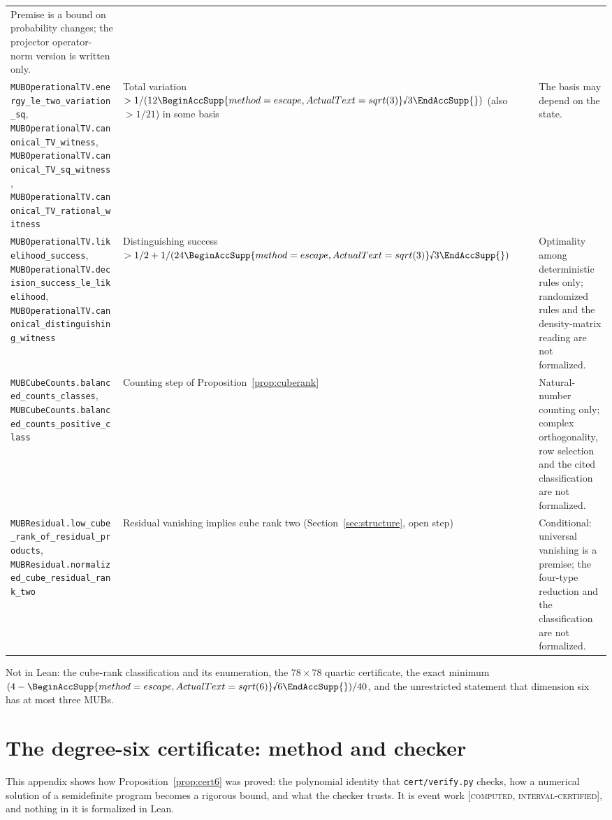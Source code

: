 \documentclass[11pt]{article}
\newcommand{\rnum}[1]{\BeginAccSupp{method=escape,ActualText=sqrt(#1)}\text{\textsurd}#1\EndAccSupp{}}
\newcommand{\st}[1]{\textsc{[#1]}}
\newcommand{\stcert}{\st{computed, interval-certified}}
\theoremstyle{definition}
\theoremstyle{remark}
\begin{document}
{\begin{longtable}{@{}>{\raggedright\arraybackslash}p{5.6cm}>{\raggedright\arraybackslash}p{4.2cm}>{\raggedright\arraybackslash}p{5.6cm}@{}}
Premise is a bound on probability changes; the projector operator-norm version is written only.\\
\texttt{MUBOperationalTV.}\allowbreak\texttt{energy\_le\_two\_variation\_sq}, \texttt{MUBOperationalTV.}\allowbreak\texttt{canonical\_TV\_witness},
\texttt{MUBOperationalTV.}\allowbreak\texttt{canonical\_TV\_sq\_witness}, \texttt{MUBOperationalTV.}\allowbreak\texttt{canonical\_TV\_rational\_witness} &
Total variation $>1/(12\rnum{3})$ (also $>1/21$) in some basis & The basis may depend on the state.\\
\texttt{MUBOperationalTV.}\allowbreak\texttt{likelihood\_success}, \texttt{MUBOperationalTV.}\allowbreak\texttt{decision\_success\_le\_likelihood},
\texttt{MUBOperationalTV.}\allowbreak\texttt{canonical\_distinguishing\_witness} & Distinguishing success $>1/2+1/(24\rnum{3})$ &
Optimality among deterministic rules only; randomized rules and the density-matrix reading are not
formalized.\\
\texttt{MUBCubeCounts.}\allowbreak\texttt{balanced\_counts\_classes}, \texttt{MUBCubeCounts.}\allowbreak\texttt{balanced\_counts\_positive\_class} &
Counting step of Proposition~\ref{prop:cuberank} & Natural-number counting only; complex orthogonality, row
selection and the cited classification are not formalized.\\
\texttt{MUBResidual.}\allowbreak\texttt{low\_cube\_rank\_of\_residual\_products},
\texttt{MUBResidual.}\allowbreak\texttt{normalized\_cube\_residual\_rank\_two} & Residual vanishing implies cube rank two
(Section~\ref{sec:structure}, open step) & Conditional: universal vanishing is a premise; the four-type
reduction and the classification are not formalized.\\
\bottomrule
\end{longtable}}

Not in Lean: the cube-rank classification and its enumeration, the $78\times78$ quartic certificate, the exact
minimum $(4-\rnum{6})/40$, and the unrestricted statement that dimension six has at most three MUBs.

\section{The degree-six certificate: method and checker}\label{app:cert}

This appendix shows how Proposition~\ref{prop:cert6} was proved: the polynomial identity that \texttt{cert/verify.py}
checks, how a numerical solution of a semidefinite program becomes a rigorous bound, and what the checker trusts. It is event work
\stcert, and nothing in it is formalized in Lean.
\end{document}
